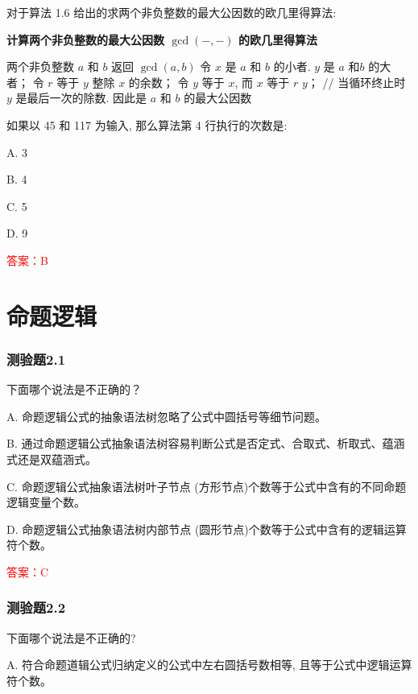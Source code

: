 \documentclass[UTF8, heading=true]{ctexart}
\begin{document}
对于算法 1.6 给出的求两个非负整数的最大公因数的欧几里得算法:

\begin{algorithm}
  \caption{\textbf{计算两个非负整数的最大公因数 $\operatorname{gcd}(-,-)$ 的欧几里得算法}}
  \begin{algorithmic}[1]
    \Require 两个非负整数 $a$ 和 $b$
    \Ensure 返回 $\operatorname{gcd}(a, b)$
    \State 令 $x$ 是 $a$ 和 $b$ 的小者. $y$ 是 $a$ 和$b$ 的大者；
    \State 令 $r$ 等于 $y$ 整除 $x$ 的余数；
    \State 令 $y$ 等于 $x$, 而 $x$ 等于 $r$
    \EndWhile
    \State \Return $y$； // 当循环终止时 $y$ 是最后一次的除数. 因此是 $a$ 和 $b$ 的最大公因数
  \end{algorithmic}
\end{algorithm}

如果以 45 和 117 为输入, 那么算法第 4 行执行的次数是: $\qquad$

A. 3

B. 4

C. 5

D. 9

\textcolor{red}{答案：B}

\clearpage

\section{命题逻辑}

\subsubsection{测验题2.1}

下面哪个说法是不正确的？

A. 命题逻辑公式的抽象语法树忽略了公式中圆括号等细节问题。

B. 通过命题逻辑公式抽象语法树容易判断公式是否定式、合取式、析取式、蕴涵式还是双蕴涵式。

C. 命题逻辑公式抽象语法树叶子节点 (方形节点)个数等于公式中含有的不同命题逻辑变量个数。

D. 命题逻辑公式抽象语法树内部节点 (圆形节点)个数等于公式中含有的逻辑运算符个数。

\textcolor{red}{答案：C}

\subsubsection{测验题2.2}

下面哪个说法是不正确的?

A. 符合命题道辑公式归纳定义的公式中左右圆括号数相等, 且等于公式中逻辑运算符个数。
\end{document}
